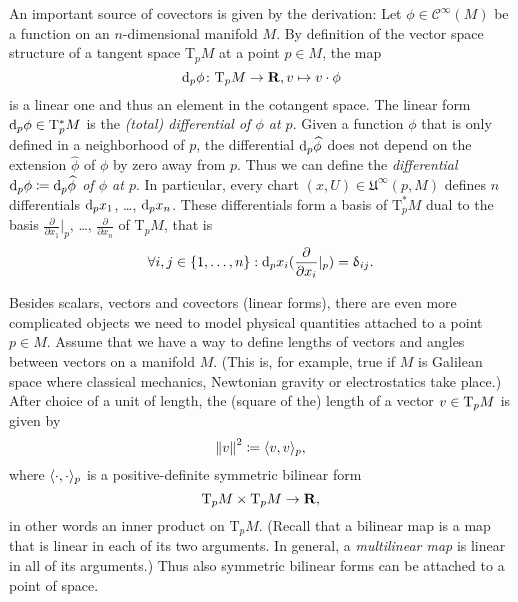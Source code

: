An important source of covectors is given by the derivation: Let $\phi \in \mathcal
C^\infty(M)$ be a function on an $n$-dimensional manifold $M$. By definition 
of the vector space structure of a tangent space $\mathrm T_p M$ at a point $p \in M$,
the map
\[
  \mathrm d_p \phi\colon \mathrm T_p M \to \mathbf{R},
  v \mapsto v \cdot \phi
\]
is a linear one and thus an element in the cotangent space. The linear form
$\mathrm d_p \phi \in \mathrm T^*_p M$ is the \emph{(total) differential of $\phi$ at
$p$}. Given a function $\phi$ that is only defined in a neighborhood of $p$, the
differential $\mathrm d_p \widehat\phi$ does not depend on the extension $\widehat \phi$
of $\phi$ by zero away from $p$. Thus we can define the \emph{differential
$\mathrm d_p \phi \coloneqq \mathrm d_p \widehat \phi$ of $\phi$ at $p$}. In particular,
every chart $(x, U) \in \mathfrak U^\infty(p, M)$ defines $n$ differentials
$\mathrm d_p x_1$, \dots, $\mathrm d_p x_n$. These differentials form a basis of
$\mathrm T^*_p M$ dual to the basis $\frac{\partial}{\partial x_1}|_p$, \dots,
$\frac{\partial}{\partial x_n}$ of $\mathrm T_p M$, that is
\[
  \forall i, j \in \lbrace1, \dotsc, n\rbrace:
  \mathrm d_p x_i(\frac{\partial}{\partial x_i}|_p) = \updelta_{ij}.
\]

Besides scalars, vectors and covectors (linear forms), there are even more
complicated objects we need to model physical quantities attached to a point
$p \in M$. Assume that we have a way to define lengths of vectors and angles
between vectors on a manifold $M$. (This is, for example, true if $M$ is
Galilean space where classical mechanics, Newtonian gravity or electrostatics
take place.) After choice of a unit of length, the (square of the)
length of a vector $v \in \mathrm T_p M$ is given by
\[
  {\lVert v\rVert}^2 \coloneqq \langle v, v\rangle_p,
\]
where $\langle\cdot, \cdot\rangle_p$ is a positive-definite symmetric bilinear form
\[
  \mathrm T_p M \times \mathrm T_p M \to \mathbf{R},
\]
in other words an inner product on $\mathrm T_p M$. (Recall that a bilinear map
is a map that is linear in each of its two arguments. In general, a \emph{multilinear
map} is linear in all of its arguments.) Thus also symmetric bilinear
forms can be attached to a point of space.

